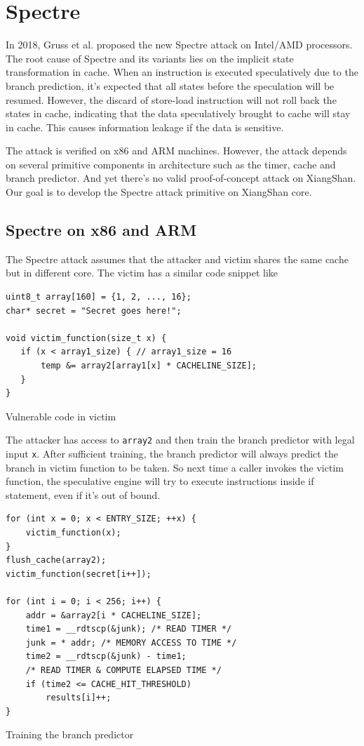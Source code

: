 \section{Spectre}
In 2018, Gruss et al.\cite{spectre} proposed the new Spectre attack on Intel/AMD processors. The root cause of Spectre and its variants lies on the implicit state transformation in cache. When an instruction is executed speculatively due to the branch prediction, it's expected that all states before the speculation will be resumed. However, the discard of store-load instruction will not roll back the states in cache, indicating that the data speculatively brought to cache will stay in cache. This causes information leakage if the data is sensitive.

The attack is verified on x86 and ARM machines. However, the attack depends on several primitive components in architecture such as the timer, cache and branch predictor. And yet there's no valid proof-of-concept attack on XiangShan. Our goal is to develop the Spectre attack primitive on XiangShan core.

\subsection{Spectre on x86 and ARM}
The Spectre attack assumes that the attacker and victim shares the same cache but in different core. The victim has a similar code snippet like

\begin{listing}[!h]
\begin{verbatim}
uint8_t array[160] = {1, 2, ..., 16};
char* secret = "Secret goes here!";

void victim_function(size_t x) {
   if (x < array1_size) { // array1_size = 16
       temp &= array2[array1[x] * CACHELINE_SIZE];
   }
}
\end{verbatim}
\label{listing:spectre_vulnerable}
\caption{Vulnerable code in victim}
\end{listing}

The attacker has access to \verb|array2| and then train the branch predictor with legal input \verb|x|. After sufficient training,
the branch predictor will always predict the branch in victim function to be taken. So next time a caller invokes the victim function,
the speculative engine will try to execute instructions inside if statement, even if it's out of bound.

\begin{listing}[!h]
\begin{verbatim}
for (int x = 0; x < ENTRY_SIZE; ++x) {
    victim_function(x);
}
flush_cache(array2);
victim_function(secret[i++]);

for (int i = 0; i < 256; i++) {
    addr = &array2[i * CACHELINE_SIZE];
    time1 = __rdtscp(&junk); /* READ TIMER */
    junk = * addr; /* MEMORY ACCESS TO TIME */
    time2 = __rdtscp(&junk) - time1; 
    /* READ TIMER & COMPUTE ELAPSED TIME */
    if (time2 <= CACHE_HIT_THRESHOLD)
        results[i]++;
}

\end{verbatim}
\label{listing:training-bp}
\caption{Training the branch predictor}
\end{listing}

